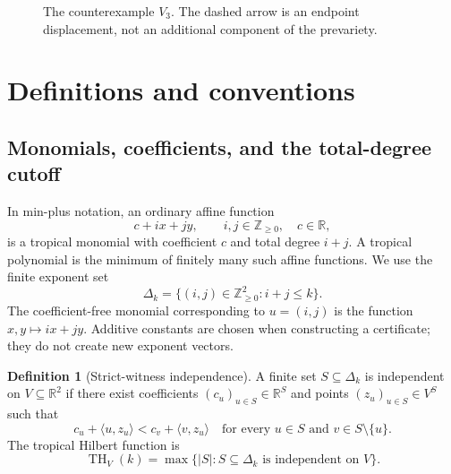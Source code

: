 \documentclass[11pt,a4paper]{article}
\numberwithin{equation}{section}
\theoremstyle{definition}
\newtheorem{definition}[theorem]{Definition}
\theoremstyle{remark}
\newcommand{\R}{\mathbb R}
\newcommand{\N}{\mathbb Z_{\geq0}}
\newcommand{\tHilb}{\operatorname{TH}}
\newcommand{\ip}[2]{\langle #1,#2\rangle}
\begin{document}
\begin{figure}[ht]
\centering
{}
\caption{The counterexample $V_3$. The dashed arrow is an endpoint displacement,
not an additional component of the prevariety.}
\label{fig:geometry}
\end{figure}

\FloatBarrier
\section{Definitions and conventions}
\label{sec:definitions}

\subsection{Monomials, coefficients, and the total-degree cutoff}

In min-plus notation, an ordinary affine function
\[
c+ix+jy,\qquad i,j\in\N,\quad c\in\R,
\]
is a tropical monomial with coefficient $c$ and total degree $i+j$.
A tropical polynomial is the minimum of finitely many such affine functions.
We use the finite exponent set
\begin{equation}
\label{eq:Delta}
\Delta_k=\{(i,j)\in\N^2:i+j\leq k\}.
\end{equation}
The coefficient-free monomial corresponding to $u=(i,j)$ is the function
$x,y\mapsto ix+jy$. Additive constants are chosen when constructing a
certificate; they do not create new exponent vectors.

\begin{definition}[Strict-witness independence]
\label{def:independent}
A finite set $S\subseteq\Delta_k$ is independent on $V\subseteq\R^2$ if there
exist coefficients $(c_u)_{u\in S}\in\R^S$ and points $(z_u)_{u\in S}\in V^S$
such that
\begin{equation}
\label{eq:witness}
c_u+\ip{u}{z_u}<c_v+\ip{v}{z_u}
\quad\text{for every }u\in S\text{ and }v\in S\setminus\{u\}.
\end{equation}
The tropical Hilbert function is
\begin{equation}
\label{eq:THdefinition}
\tHilb_V(k)=\max\{|S|:S\subseteq\Delta_k\text{ is independent on }V\}.
\end{equation}
\end{definition}
\end{document}
